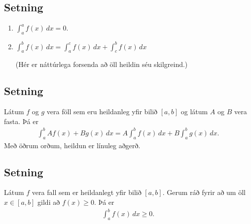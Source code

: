 \documentclass[b5paper,10pt,icelandic]{sphinxmanual}
\begin{document}
\subsection{Setning}
\label{\detokenize{kafli06:id3}}\begin{enumerate}
\item {} 
\(\int_a^a f(x)\,dx=0\).

\item {} 
\(\int_a^b f(x)\,dx=\int_a^c f(x)\,dx+\int_c^b f(x)\,dx\)

(Hér er náttúrlega forsenda að öll heildin séu skilgreind.)

\end{enumerate}


\subsection{Setning}
\label{\detokenize{kafli06:id4}}
Látum \(f\) og \(g\) vera föll sem eru heildanleg yfir bilið
\([a,b]\) og látum \(A\) og \(B\) vera fasta. Þá er
\begin{equation*}
\begin{split}\int_a^b Af(x)+Bg(x)\,dx=A\int_a^b f(x)\,dx+B\int_a^b g(x)\,dx.\end{split}
\end{equation*}
Með öðrum orðum, heildun er línuleg aðgerð.


\subsection{Setning}
\label{\detokenize{kafli06:id5}}
Látum \(f\) vera fall sem er heildanlegt yfir bilið \([a, b]\).
Gerum ráð fyrir að um öll \(x\in [a, b]\) gildi að
\(f(x)\geq 0\). Þá er
\begin{equation*}
\begin{split}\int_a^b f(x)\,dx\geq 0.\end{split}
\end{equation*}
\end{document}
